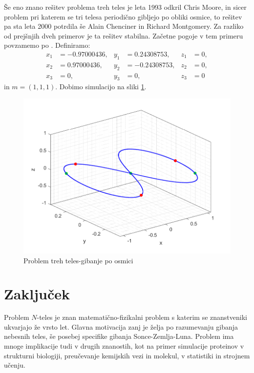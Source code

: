 \documentclass[a4paper,12pt]{article}
\begin{document}
Še eno znano rešitev problema treh teles je leta 1993 odkril Chris Moore, in sicer problem pri katerem
se tri telesa periodično gibljejo po obliki osmice, 
to rešitev pa sta leta 2000 potrdila še Alain Chenciner in Richard Montgomery.
Za razliko od prejšnjih dveh primerov je ta rešitev stabilna.
Začetne pogoje v tem primeru povzamemo po \cite{James}. Definiramo: 
\begin{align*}
    x_1&=-0.97000436, &  y_1&=0.24308753, & z_1&=0, \\
    x_2&=0.97000436, & y_2&=-0.24308753, & z_2&=0, \\
    x_3&=0, & y_3&=0, & z_3&=0
\end{align*}
in $m = (1, 1, 1)$. Dobimo simulacijo na sliki \ref{osmica}.
\begin{figure}[H]
    \centering
    \includegraphics[width=\textwidth]{figures/osmica.png}
    \caption{Problem treh teles-gibanje po osmici}
    \label{osmica}
\end{figure}



\section{Zaključek}
Problem $N$-teles je znan matematično-fizikalni problem s katerim se znanstveniki ukvarjajo že vrsto let.
Glavna motivacija zanj je želja po razumevanju gibanja nebesnih teles, še posebej specifike gibanja 
Sonce-Zemlja-Luna. Problem ima mnoge implikacije tudi v drugih znanostih, kot na primer simulacije proteinov 
v strukturni biologiji, preučevanje kemijskih vezi in molekul, v statistiki in strojnem učenju.
\end{document}
